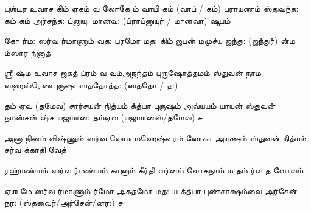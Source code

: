 \documentclass[10pt]{article}
\begin{document}
{\newpage
\slokadl
{யுஶ்டிர உவாச}
{கிம் \hdspc ஏகம் வ லோகே} {ம் வாபி \hdspc {}கம் (வாப் / கம்) பராயணம்}
{ஸ்துவந்த: கம் கம் \hdspc அர்சந்த:} {ப்னுயு: \hdspc மானவ: (ப்ராப்னுயுர் / மானவா) ஷுபம்}

\slokasl
{கோ ர்ம: ஸர்வ ர்மாணாம்}{ வத: பரமோ மத:}
{கிம் ஜபன் \hdspc மமுச்ய ஜந்து: (ஜந்துர்)}{ ன்ம ம்ஸார ந்னாத்}

\slokadl 
{ஶ்ரீ ஷ்ம உவாச}
{ஜகத் ப்ரம் வ வம்}{அநந்தம் புருஷோத்தமம்}
{ஸ்துவன் \hdspc நாம ஸஹஸ்ரேண}{புருஷ: ஸததோத்த: (ஸததோ / த:)}

\slokasl
{தம் \hdspc ஏவ (தமேவ) சார்சயன் \hdspc நித்யம்} {க்த்யா புருஷம் \hdspc அவ்யயம்}
{யாயன் ஸ்துவன் நமஸ்சன் \hdspc ஷ்ச} {யஜமான: தம்\hdspc ஏவ (யஜமானஸ்/தமேவ) ச}

\slokasl
{அனா நினம் விஷ்ணும்} {ஸர்வ லோக மஹேஷ்வரம்}
{லோகா \hdspc அயக்ஷம் ஸ்துவன் \hdspc நித்யம்} {சர்வ க்காதி வேத்}

\slokasl
{ரஹ்மண்யம் ஸர்வ ர்மண்யம்} {கானாம் கீர்தி வர்னம்}
{லோகநாம் ம \hdspc {}தம்} {ர்வ த வோவம்}

\slokasl
{ஏஶ மே ஸர்வ ர்மாணாம்}{ ர்மோ \hdspc அகதமோ மத:}
{ய \hdspc {}க்த்யா புண்காக்ஷம்}{வை அர்சேன் நர: (ஸ்தவைர்/அர்சேன்/னர:) ச}


} 
\end{document}
